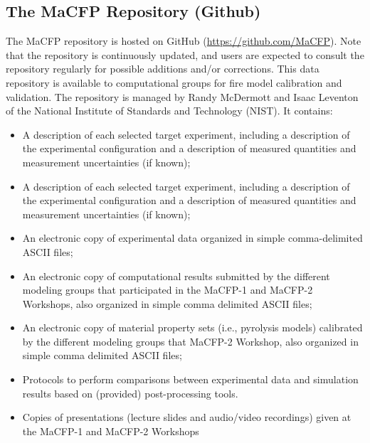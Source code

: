 \documentclass[12pt]{article}
\begin{document}
\subsection{The MaCFP Repository (Github)}
The MaCFP repository is hosted on GitHub (\url{https://github.com/MaCFP}). Note that the repository is continuously updated, and users are expected to consult the repository regularly for possible additions and/or corrections. This data repository is available to computational groups for fire model calibration and validation. The repository is managed by Randy McDermott and Isaac Leventon of the National Institute of Standards and Technology (NIST). It contains:
\begin{itemize}[noitemsep]
 \item A description of each selected target experiment, including a description of the experimental configuration and a description of measured quantities and measurement uncertainties (if known);
  \item A description of each selected target experiment, including a description of the experimental configuration and a description of measured quantities and measurement uncertainties (if known);
 \item An electronic copy of experimental data organized in simple comma-delimited ASCII files;
 \item An electronic copy of computational results submitted by the different modeling groups that participated in the MaCFP-1 and MaCFP-2 Workshops, also organized in simple comma delimited ASCII files;
  \item An electronic copy of material property sets (i.e., pyrolysis models) calibrated by the different modeling groups that MaCFP-2 Workshop, also organized in simple comma delimited ASCII files;
 \item Protocols to perform comparisons between experimental data and simulation results based on (provided) post-processing tools.
 \item Copies of presentations (lecture slides and audio/video recordings) given at the MaCFP-1 and MaCFP-2 Workshops
\end{itemize}
\end{document}
